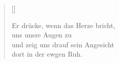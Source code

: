 \begin{center}
\settowidth{\versewidth}{Der, vor dem die Welt erschrickt,}
\begin{verse}[\versewidth]

 Er drücke, wenn das Herze bricht,\\
uns unsre Augen zu\\
und zeig uns drauf sein Angesicht\\
dort in der ewgen Ruh.

\end{verse}
\end{center}


